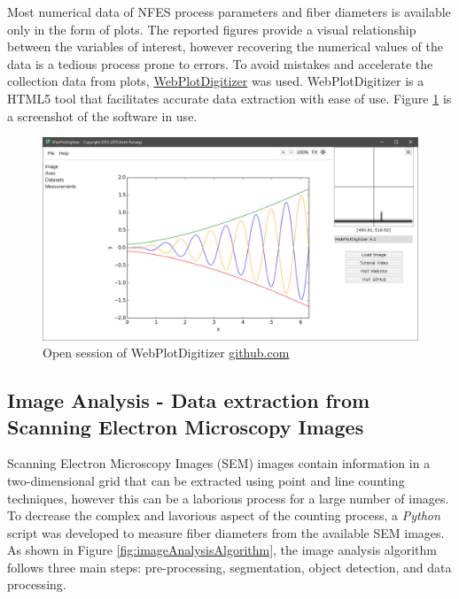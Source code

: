 Most numerical data of NFES process parameters and fiber diameters is available only in the form of plots. The reported figures provide a visual relationship between the variables of interest, however recovering the numerical values of the data is a tedious process prone to errors. To avoid mistakes and accelerate the collection data from plots, \href{https://github.com/ankitrohatgi/WebPlotDigitizer}{WebPlotDigitizer} was used. WebPlotDigitizer is a HTML5 tool that facilitates accurate data extraction with ease of use. Figure \ref{fig:screenshotWebPlotDigitizer} is a screenshot of the software in use.

\begin{figure}[th]
\centering
\includegraphics[scale=0.45]{./Figures/screenshotWebPlotDigitizer.png}
\decoRule
\caption[WebPlotDigitizer home-screen]{Open session of WebPlotDigitizer \href{https://github.com/ankitrohatgi/WebPlotDigitizer}{github.com}}
\label{fig:screenshotWebPlotDigitizer}
\end{figure}

\subsection{Image Analysis - Data extraction from Scanning Electron Microscopy Images}

Scanning Electron Microscopy Images (SEM) images contain information in a two-dimensional grid that can be extracted using point and line counting techniques, however this can be a laborious process for a large number of images. To decrease the complex and lavorious aspect of the counting process, a \emph{Python} script was developed to measure fiber diameters from the available SEM images. As shown in Figure \ref{fig:imageAnalysisAlgorithm}, the image analysis algorithm follows three main steps: pre-processing, segmentation, object detection, and data processing.

